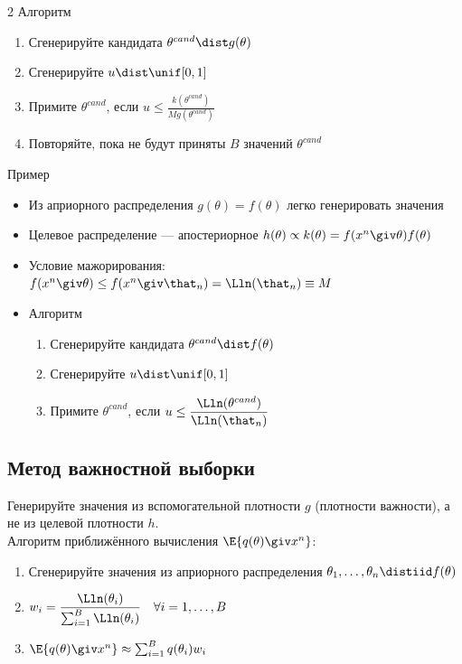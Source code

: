 \documentclass[landscape]{article}
\begin{document}
\begin{multicols*}{2}
Алгоритм
\begin{enumerate}
  \item Сгенерируйте кандидата $\theta^{cand} \dist g(\theta)$
  \item Сгенерируйте $u \dist \unif[0,1]$
  \item Примите $\theta^{cand}$, если
    $u \le \displaystyle\frac{k(\theta^{cand})}{Mg(\theta^{cand})}$
  \item Повторяйте, пока не будут приняты $B$ значений $\theta^{cand}$
\end{enumerate}

Пример
\begin{itemize}
  \item Из априорного распределения $g(\theta) = f(\theta)$ легко генерировать значения
  \item Целевое распределение — апостериорное
    $h(\theta) \propto k(\theta) = f(x^n\giv \theta) f(\theta)$
  \item Условие мажорирования:
    $f(x^n\giv\theta) \le f(x^n\giv\that_n) = \Lln(\that_n)\equiv M$
  \item Алгоритм
    \begin{enumerate}
      \item Сгенерируйте кандидата $\theta^{cand} \dist f(\theta)$
      \item Сгенерируйте $u \dist \unif[0,1]$
      \item Примите $\theta^{cand}$, если
        $u \le \displaystyle\frac{\Lln(\theta^{cand})}{\Lln(\that_n)}$
    \end{enumerate}
\end{itemize}

\subsection{Метод важностной выборки}

Генерируйте значения из вспомогательной плотности $g$ (плотности важности), а не из целевой плотности $h$.\\
Алгоритм приближённого вычисления $\E{q(\theta) \giv x^n}$:
\begin{enumerate}
  \item Сгенерируйте значения из априорного распределения $\theta_1,\ldots,\theta_n \distiid f(\theta)$
  \item $w_i = \displaystyle\frac{\Lln(\theta_i)}{\sum_{i=1}^B \Lln(\theta_i)}
    \quad\forall i = 1,\ldots,B$
  \item $\E{q(\theta)\giv x^n} \approx \sum_{i=1}^B q(\theta_i)w_i$
\end{enumerate}


\end{multicols*}
\end{document}
